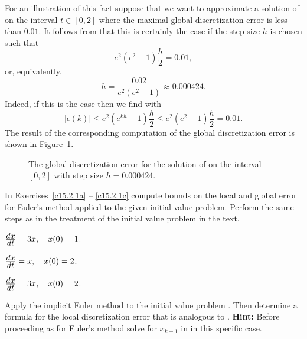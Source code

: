 \documentclass{ximera}
\begin{document}
For an illustration of this fact suppose that we want to approximate 
a solution of  on the interval $t\in [0,2]$
where the maximal global discretization 
error is less than $0.01$.
It follows from  that this is certainly the case if the
step size $h$ is chosen such that
\[
e^2(e^2-1)\frac{h}{2} = 0.01,
\]
or, equivalently,
\[
h = \frac{0.02}{e^2(e^2-1)} \approx 0.000424.
\]
Indeed, if this is the case then we find  with 
\[
|\epsilon(k)| \le e^2(e^{kh}-1)\frac{h}{2} \le e^2(e^2-1)\frac{h}{2} = 0.01.
\]
The result of the corresponding \Matlab computation of the global
discretization error is shown in Figure~\ref{fig:globerr2}.
\begin{figure}[htb]
   \centerline{%
   }
   \caption{The global discretization error for the solution of
   \protect{} on the interval $[0,2]$ with
   step size $h=0.000424$.}
   \label{fig:globerr2}
\end{figure}



\EXER

\TEXER

\noindent In Exercises~\ref{c15.2.1a} -- \ref{c15.2.1c} compute
bounds on the local and global error for Euler's method applied
to the given initial value problem.  Perform the same steps as in
the treatment of the initial value problem  in
the text.
\begin{exercise} \label{c15.2.1a}
$\frac{\displaystyle dx}{\displaystyle dt} = 3x,\quad x(0)=1$.
\end{exercise}
\begin{exercise} \label{c15.2.1b}
$\frac{\displaystyle dx}{\displaystyle dt} = x,\quad x(0)=2$.
\end{exercise}
\begin{exercise} \label{c15.2.1c}
$\frac{\displaystyle dx}{\displaystyle dt} = 3x,\quad x(0)=2$.
\end{exercise}

\begin{exercise} \label{c15.2.2}
Apply the implicit Euler method to the initial value problem
.  Then determine a formula for the local 
discretization error that is analogous to .
{\bf Hint:} Before proceeding as for Euler's method solve
for $x_{k+1}$ in  in this specific case.
\end{exercise}

\CEXER
\end{document}

